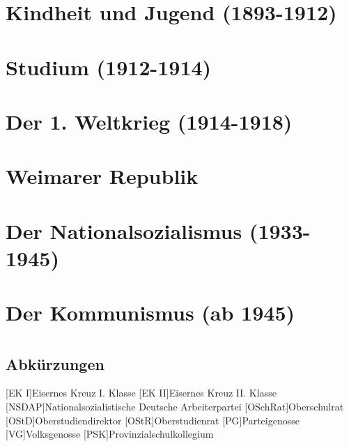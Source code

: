 \documentclass[a5paper,pagesize,10pt,twoside=true]{scrbook}
\begin{document}
\mbox{}
\newpage




\chapter*{}


\chapter{Kindheit und Jugend (1893-1912)}


\chapter{Studium (1912-1914)}


\chapter{Der 1. Weltkrieg (1914-1918)}


\chapter{Weimarer Republik}


\chapter{Der Nationalsozialismus (1933-1945)}


\chapter{Der Kommunismus (ab 1945)}


\mbox{}
\newpage

\chapter*{}

\mbox{}
\newpage




\newpage
\appendix
{}
\section*{Abkürzungen}
\begin{acronym}
	[EK I]{Eisernes Kreuz I. Klasse}
	[EK II]{Eisernes Kreuz II. Klasse}
	[NSDAP]{Nationalsozialistische Deutsche Arbeiterpartei}
	[OSchRat]{Oberschulrat}
	[OStD]{Ober\-studien\-di\-rek\-tor}
	[OStR]{Oberstudienrat}
	[PG]{Parteigenosse}
	[VG]{Volksgenosse}
	[PSK]{Provinzialschulkollegium}
\end{acronym}
\end{document}
